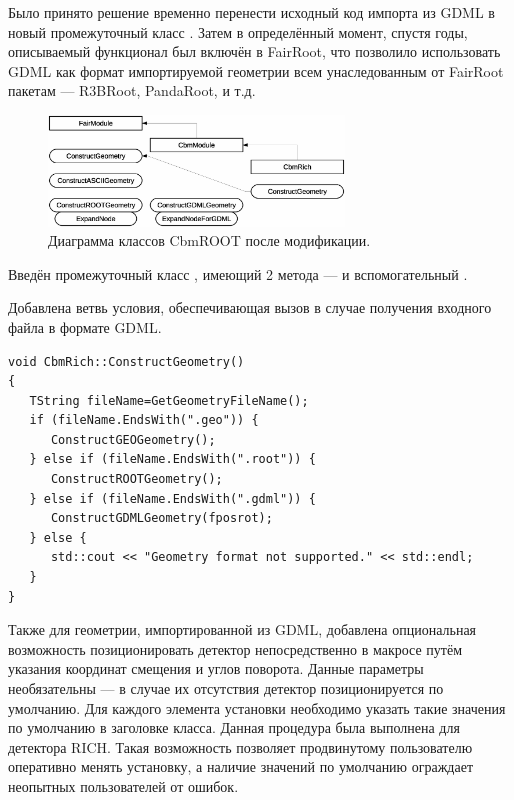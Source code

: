 Было принято решение временно перенести исходный код импорта из GDML в новый промежуточный класс . Затем в определённый момент, спустя годы, описываемый функционал был включён в FairRoot, что позволило использовать GDML как формат импортируемой геометрии всем унаследованным от FairRoot пакетам --- R3BRoot, PandaRoot, и т.д.


\begin{figure}[H]
\centering
\includegraphics[width=0.7\textwidth]{pictures/FairModule_classes_after.eps}
\caption{Диаграмма классов CbmROOT после модификации.}
\label{fig:classesAfter}
\end{figure}

Введён промежуточный класс , имеющий 2 метода ---  и вспомогательный .

Добавлена ветвь условия, обеспечивающая вызов  в случае получения входного файла в формате GDML.

\begin{lstlisting}
void CbmRich::ConstructGeometry()
{
   TString fileName=GetGeometryFileName();
   if (fileName.EndsWith(".geo")) {
      ConstructGEOGeometry();
   } else if (fileName.EndsWith(".root")) {
      ConstructROOTGeometry();
   } else if (fileName.EndsWith(".gdml")) {
      ConstructGDMLGeometry(fposrot);
   } else {
      std::cout << "Geometry format not supported." << std::endl;
   }
}
\end{lstlisting}

Также для геометрии, импортированной из GDML, добавлена опциональная возможность позиционировать детектор непосредственно в макросе путём указания координат смещения и углов поворота. Данные параметры необязательны --- в случае их отсутствия детектор позиционируется по умолчанию. Для каждого элемента установки необходимо указать такие значения по умолчанию в заголовке класса. Данная процедура была выполнена для детектора RICH. Такая возможность позволяет продвинутому пользователю оперативно менять установку, а наличие значений по умолчанию ограждает неопытных пользователей от ошибок.

